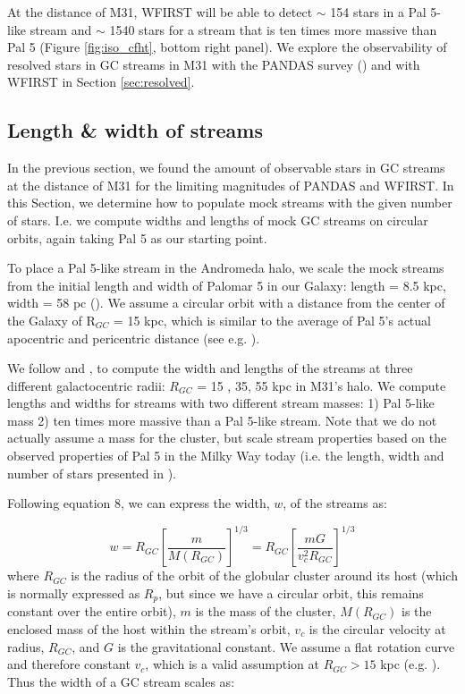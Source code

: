 \documentclass[twocolumn]{aastex62}
\begin{document}
At the distance of M31, WFIRST will be able to detect $\sim$ 154 stars in a Pal 5-like stream and $\sim$ 1540 stars for a stream that is ten times more massive than Pal 5 (Figure \ref{fig:iso_cfht}, bottom right panel). We explore the observability of resolved stars in GC streams in M31 with the PANDAS survey (\citealt{mcconnachie09}) and with WFIRST in Section \ref{sec:resolved}. 




\subsection{Length \& width of streams}
\label{sec:length}
In the previous section, we found the amount of observable stars in GC streams at the distance of M31 for the limiting magnitudes of PANDAS and WFIRST. In this Section, we determine how to populate mock streams with the given number of stars. I.e. we compute widths and lengths of mock GC streams on circular orbits, again taking Pal 5 as our starting point. 

To place a Pal 5-like stream in the Andromeda halo, %
we scale the mock streams from the initial length and width of Palomar 5 in our Galaxy: length = 8.5 kpc, width = 58 pc (\citealt{ibata16}). We assume a circular orbit with a distance from the center of the Galaxy of R$_{GC}$ = 15 kpc, which is similar to the average of Pal 5's actual apocentric and pericentric distance (see e.g. \citealt{erkal17}). 

We follow \citet{johnston98} and \citet{johnston01}, to compute the width and lengths of the streams at three different galactocentric radii: $R_{GC}$ = 15 , 35, 55 kpc in M31's halo. We compute lengths and widths for streams with two different stream masses: 1) Pal 5-like mass 2) ten times more massive than a Pal 5-like stream. Note that we do not actually assume a mass for the cluster, but scale stream properties based on the observed properties of Pal 5 in the Milky Way today (i.e. the length, width and number of stars presented in \citealt{ibata16}).  

Following \citet{johnston01} equation 8, we can express the width, $w$, of the streams as:

\begin{equation}
w = R_{GC} \left[\frac{m}{M(R_{GC})}\right]^{1/3} = R_{GC} \left[\frac{m G}{v_c^2 R_{GC}}\right]^{1/3} 
\end{equation}
where $R_{GC}$ is the radius of the orbit of the globular cluster around its host (which is normally expressed as $R_p$, but since we have a circular orbit, this remains constant over the entire orbit), $m$ is the mass of the cluster, $M(R_{GC})$ is the enclosed mass of the host within the stream's orbit, $v_c$ is the circular velocity at radius, $R_{GC}$, and $G$ is the gravitational constant. We assume a flat rotation curve and therefore constant  $v_c$, which is a valid assumption at $R_{GC} > 15$ kpc (e.g. \citealt{chemin09}). Thus the width of a GC stream scales as:
\end{document}
